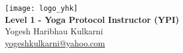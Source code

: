 \begin{titlepage}
    \begin{center}
        \begin{tcolorbox}[coverstyle, title=Yoga Certification Board (YCB)]
            \vspace*{6.5cm}
            \texttt{[image: logo\_yhk]}\\[2cm]
            {\Huge \textbf{Level 1 - Yoga Protocol Instructor (YPI)}}\\[0.5cm]
            {\Large Yogesh Haribhau Kulkarni}\\[2cm]
            {\Large \href{mailto:yogeshkulkarni@yahoo.com}{yogeshkulkarni@yahoo.com}}\\
            \vspace*{6.5cm}
        \end{tcolorbox}
    \end{center}
\end{titlepage}

\newpage
\thispagestyle{empty}
\hspace{1cm} %